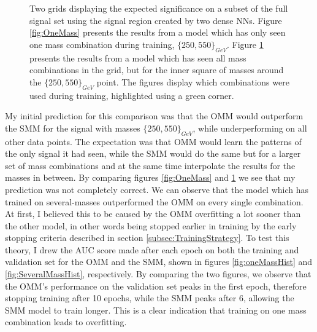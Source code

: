 \begin{figure}
{\begin{subfigure}{.6\textwidth}
        \vspace{-1.cm}
        \caption{}
        \label{fig:SeveralMass}
    \end{subfigure}
    }
    \caption[Two grids displaying the expected significance on a subset of the full signal set using the signal region 
    created by two dense \acs{NN}'s, each training on different amounts of signal.]{Two grids displaying the expected significance 
    on a subset of the full signal set using the signal region created by two dense \acs{NN}s. Figure \ref{fig:OneMass} presents the results 
    from a model which has only seen one mass combination during training, $\{250,550\}_{GeV}$. Figure 
    \ref{fig:SeveralMass} presents the results from a model which has seen all mass combinations in the grid, but for the inner square of masses
    around the $\{250,550\}_{GeV}$ point. The figures display which combinations were used during training, highlighted using a green corner. 
    }
    \label{fig:Interpolation}
\end{figure}
My initial prediction for this comparison was that the \ac{OMM} would outperform the \ac{SMM} for the signal with masses
$\{250,550\}_{GeV}$, while underperforming on all other data points. The expectation was that \ac{OMM} 
would learn the patterns of the only signal it had seen, while the \ac{SMM} would do the same but for a larger set of mass combinations and 
at the same time interpolate the results for the masses in between. By comparing figures \ref{fig:OneMass} and \ref{fig:SeveralMass} we 
see that my prediction was not completely correct. We can observe that the model which has trained on several-masses outperformed the 
\ac{OMM} on every single combination. At first, I believed this to be caused by the \ac{OMM} overfitting a lot sooner than the other 
model, in other words being stopped earlier in training by the early stopping criteria described in section \ref{subsec:TrainingStrategy}. 
To test this theory, I drew the \ac{AUC} score made after each epoch on both the training and validation set for the \ac{OMM} and the 
\ac{SMM}, shown in figures \ref{fig:oneMassHist} and \ref{fig:SeveralMassHist}, respectively. By comparing the two figures,
we observe that the \ac{OMM}'s performance on the validation set peaks in the first epoch, therefore stopping training after 
10 epochs, while the \ac{SMM} peaks after 6, allowing the \ac{SMM} model to train longer. This is a clear indication that training on 
one mass combination leads to overfitting. 
